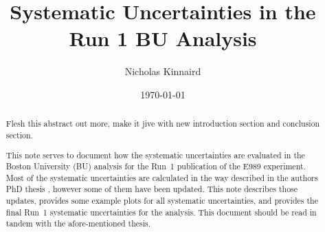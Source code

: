 \documentclass[12pt,letterpaper]{article}
\title{Systematic Uncertainties in the Run 1 BU \wa Analysis}
\author{Nicholas Kinnaird}
\date{\today}
\begin{document}
\maketitle

\begin{abstract}
	Flesh this abstract out more, make it jive with new introduction section and conclusion section.

	This note serves to document how the systematic uncertainties are evaluated in the Boston University (BU) analysis for the Run~1 publication of the E989 experiment. Most of the systematic uncertainties are calculated in the way described in the authors PhD thesis \cite{phdthesis:2020Kinnaird}, however some of them have been updated. This note describes those updates, provides some example plots for all systematic uncertainties, and provides the final Run~1 systematic uncertainties for the analysis. This document should be read in tandem with the afore-mentioned thesis.
\end{abstract}

\tableofcontents












{}
\printbibliography

\end{document}
